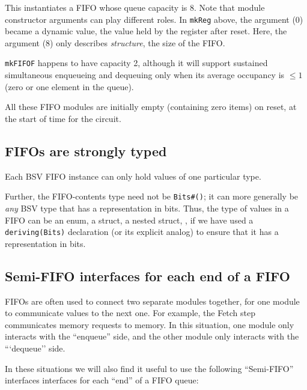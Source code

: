 This instantiates a FIFO whose queue capacity is 8.  Note that module
constructor arguments can play different roles.  In \verb|mkReg|
above, the argument (0) became a dynamic value, the value held by the
register after reset.  Here, the argument (8) only describes
\emph{structure}, {\ie} the size of the FIFO.

{\tt mkFIFOF} happens to have capacity 2, although it will support
sustained simultaneous enqueueing and dequeuing only when its average
occupancy is $\leq 1$ (zero or one element in the queue).

All these FIFO modules are initially empty (containing zero items) on
reset, {\ie} at the start of time for the circuit.


\subsection{FIFOs are strongly typed}


Each BSV FIFO instance can only hold values of one particular type.

Further, the FIFO-contents type need not be \verb|Bits#()|; it can
more generally be \emph{any} BSV type that has a representation in
bits.  Thus, the type of values in a FIFO can be an enum, a struct, a
nested struct, {\etc}, if we have used a \verb|deriving(Bits)|
declaration (or its explicit analog) to ensure that it has a
representation in bits.


\subsection{Semi-FIFO interfaces for each end of a FIFO}

\label{Sec_Semi_FIFOs}

FIFOs are often used to connect two separate modules together, for one
module to communicate values to the next one.  For example, the Fetch
step communicates memory requests to memory.  In this situation, one
module only interacts with the ``enqueue'' side, and the other module
only interacts with the ```dequeue'' side.

In these situations we will also find it useful to use the following
``Semi-FIFO'' interfaces interfaces for each ``end'' of a FIFO queue:

